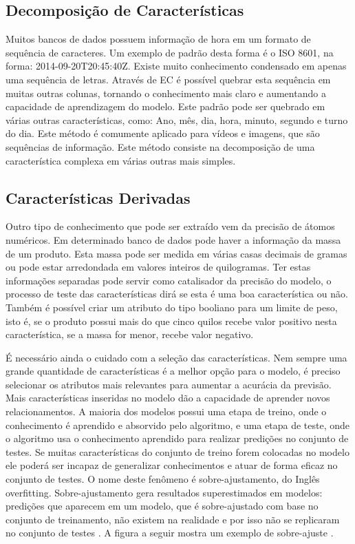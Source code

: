 \subsection{Decomposição de Características}
Muitos bancos de dados possuem informação de hora em um formato de sequência de caracteres. Um exemplo de padrão desta forma é o ISO 8601, na forma: 2014-09-20T20:45:40Z. Existe muito conhecimento condensado em apenas uma sequência de letras. Através de EC é possível quebrar esta sequência em muitas outras colunas, tornando o conhecimento mais claro e aumentando a capacidade de aprendizagem do modelo. Este padrão pode ser quebrado em várias outras características, como: Ano, mês, dia, hora, minuto, segundo e turno do dia. Este método é comumente aplicado para vídeos e imagens, que são sequências de informação. Este método consiste na decomposição de uma característica complexa em várias outras mais simples.


\subsection{Características Derivadas}
Outro tipo de conhecimento que pode ser extraído vem da precisão de átomos numéricos. Em determinado banco de dados pode haver a informação da massa de um produto. Esta massa pode ser medida em várias casas decimais de gramas ou pode estar arredondada em valores inteiros de quilogramas. Ter estas informações separadas pode servir como catalisador da precisão do modelo, o processo de teste das características dirá se esta é uma boa característica ou não. Também é possível criar um atributo do tipo booliano para um limite de peso, isto é, se o produto possui mais do que cinco quilos recebe valor positivo nesta característica, se a massa for menor, recebe valor negativo.

É necessário ainda o cuidado com a seleção das características. Nem sempre uma grande quantidade de características é a melhor opção para o modelo, é  preciso selecionar os atributos mais relevantes para aumentar a acurácia da previsão. Mais características inseridas no modelo dão a capacidade de aprender novos relacionamentos. A maioria dos modelos possui uma etapa de treino, onde o conhecimento é aprendido e absorvido pelo algoritmo, e uma etapa de teste, onde o algoritmo usa o conhecimento aprendido para realizar predições no conjunto de testes. Se muitas características do conjunto de treino forem colocadas no modelo ele poderá ser incapaz de generalizar conhecimentos e atuar de forma eficaz no conjunto de testes. O nome deste fenômeno é sobre-ajustamento, do Inglês overfitting. Sobre-ajustamento gera resultados superestimados em modelos: predições que aparecem em um modelo, que é sobre-ajustado com base no conjunto de treinamento, não existem na realidade e por isso não se replicaram no conjunto de testes \cite{what2013}. A figura a seguir mostra um exemplo de sobre-ajuste \cite{real2013}.

